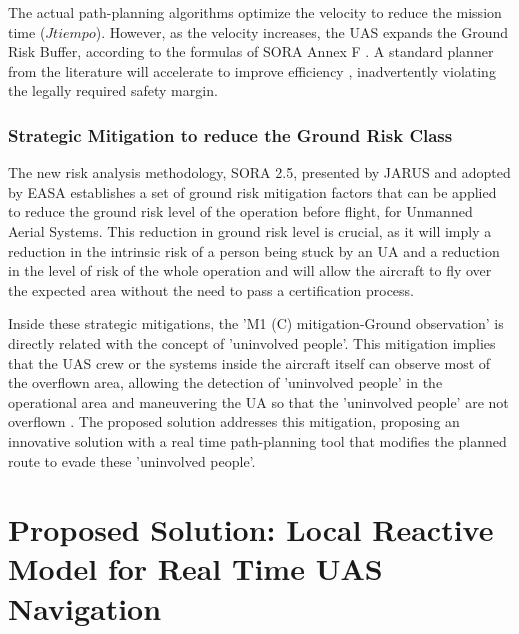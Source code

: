 \documentclass[a4paper, 11pt]{article}
\begin{document}
The actual path-planning algorithms optimize the velocity to reduce the mission time ($J{tiempo}$). However, as the velocity increases, the UAS expands the Ground Risk Buffer, according to the formulas of SORA Annex F \cite{JARUS_SORA_2_5_2024}. A standard planner from the literature will accelerate to improve efficiency \cite{dong2017efficient}, inadvertently violating the legally required safety margin.


\subsubsection{Strategic Mitigation to reduce the Ground Risk Class }

The new risk analysis methodology, SORA 2.5, presented by JARUS \cite{JARUS_SORA_2_5_2024} and adopted by EASA establishes a set of ground risk mitigation factors that can be applied to reduce the ground risk level of the operation before flight, for Unmanned Aerial Systems. This reduction in ground risk level is crucial, as it will imply a reduction in the intrinsic risk of a person being stuck by an UA and a reduction in the level of risk of the whole operation and will allow the aircraft to fly over the expected area without the need to pass a certification process. 

Inside these strategic mitigations, the 'M1 (C) mitigation-Ground observation' is directly related with the concept of 'uninvolved people'. This mitigation implies that the UAS crew or the systems inside the aircraft itself can observe most of the overflown area, allowing the detection of 'uninvolved people' in the operational area and maneuvering the UA so that the 'uninvolved people' are not overflown \cite{EASA_AMC_GM_SORA25_2025}. The proposed solution addresses this mitigation, proposing an innovative solution with a real time path-planning tool that modifies the planned route to evade these 'uninvolved people'. 



\section{Proposed Solution: Local Reactive Model for Real Time UAS Navigation}
\end{document}
